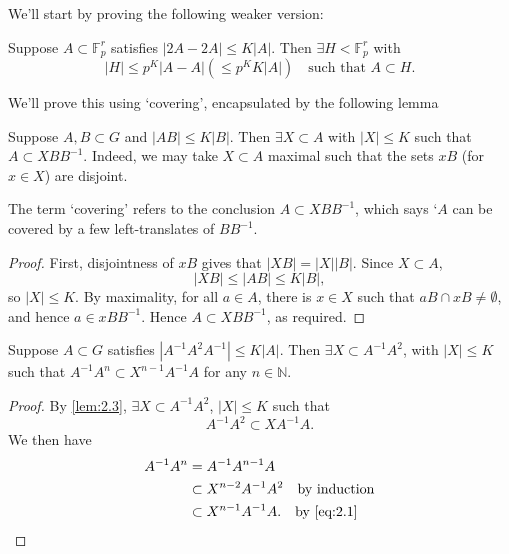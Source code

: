 \documentclass{article}
\newcommand{\F}{\mathbb{F}}
\numberwithin{equation}{section}
\begin{document}
We'll start by proving the following weaker version:
\begin{nprop}\label{prop:2.2}
  Suppose $A \subset \F_p^r$ satisfies $|2A - 2A| \leq K|A|$. Then $\exists H < \F_p^r$ with
  \begin{equation*}|H| \leq p^K |A - A| (\leq p^K K |A|) \quad \text{such that }A \subset H.\end{equation*}
\end{nprop}
We'll prove this using `covering', encapsulated by the following lemma
\begin{nlemma}\label{lem:2.3}
  Suppose $A,B \subset G$ and $|AB| \leq K|B|$. Then $\exists X \subset A$ with $|X| \leq K$ such that $A \subset X B B^{-1}$.
  Indeed, we may take $X \subset A$ maximal such that the sets $xB$ (for $x \in X$) are disjoint.
\end{nlemma}
The term `covering' refers to the conclusion $A \subset X B B^{-1}$, which says `$A$ can be covered by a few left-translates of $BB^{-1}$.
\begin{proof}
  First, disjointness of $xB$ gives that $|XB| = |X| |B|$. Since $X \subset A$,
  \begin{equation*}|XB| \leq |AB| \leq K|B|,\end{equation*}
  so $|X| \leq K$.
  By maximality, for all $a \in A$, there is $x \in X$ such that $aB \cap xB \neq \emptyset$, and hence $a \in x B B^{-1}$.
  Hence $A \subset X B B^{-1}$, as required.
\end{proof}
\begin{nlemma}\label{lem:2.4}
  Suppose $A \subset G$ satisfies $|A^{-1} A^2 A^{-1}| \leq K|A|$. Then $\exists X \subset A^{-1} A^2$, with $|X| \leq K$ such that $A^{-1} A^n \subset X^{n-1} A^{-1} A$ for any $n \in \mathbb{N}$.
\end{nlemma}
\begin{proof}
  By \cref{lem:2.3}, $\exists X \subset A^{-1} A^2$, $|X| \leq K$ such that
  \begin{equation}
    A^{-1} A^2 \subset X A^{-1} A. \label{eq:2.1}
  \end{equation}
  We then have
  \begin{align*}
    A^{-1} A^n &= A^{-1} A^{n-1} A \\
               &\subset X^{n-2} A^{-1} A^2 \quad\text{by induction}\\
               & \subset X^{n-1} A^{-1} A. \quad\text{by }\eqref{eq:2.1} \qedhere
  \end{align*}
\end{proof}
\end{document}
